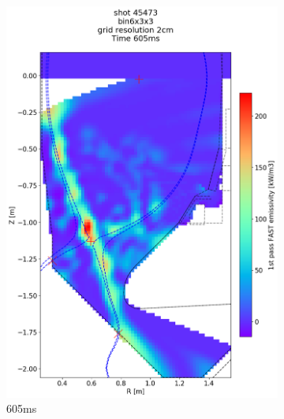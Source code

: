 \begin{figure}
\begin{subfigure}{0.355\linewidth}
         \includegraphics[trim={75 70 25 190},clip,width=\textwidth]{Chapters/chapter2/figs/IRVB-MASTU_shot-45473_export_69.png}
         \vspace*{-6.5mm}
         \caption{605ms}
         \label{fig:45473_export2_3}
     \end{subfigure}
     \begin{subfigure}{0.355\linewidth}
         \centering

\end{subfigure}
\end{figure}
